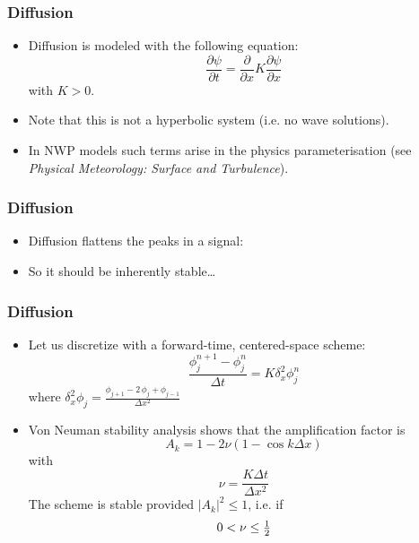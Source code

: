 \documentclass[aspectratio=43,9pt]{beamer}
\begin{document}
%
%
\begin{frame}
	\frametitle{Diffusion}
	\begin{itemize}
		\item Diffusion is modeled with the following equation:
			\begin{equation*}
				\frac{\partial \psi}{\partial t} = \frac{\partial}{\partial x} K \frac{\partial \psi}{\partial x}
			\end{equation*}
			with $K > 0$.\vspace*{2ex}
		\item Note that this is not a hyperbolic system (i.e. no wave solutions).\vspace*{2ex}
		\item In NWP models such terms arise in the physics parameterisation (see \emph{Physical Meteorology: Surface and Turbulence}).
	\end{itemize}
\end{frame}
%
%
\begin{frame}
	\frametitle{Diffusion}
	\begin{itemize}
		\item Diffusion flattens the peaks in a signal:
			\begin{center}
				\scalebox{.7}{}
			\end{center}
		\item So it should be inherently stable\ldots
	\end{itemize}
\end{frame}
%
%
\begin{frame}
	\frametitle{Diffusion}
	\begin{itemize}
		\item Let us discretize with a forward-time, centered-space scheme:
			\begin{equation*}
				\frac{\phi^{n+1}_j - \phi^n_j}{\Delta t} = K\delta_x^2\phi^n_j
			\end{equation*}
			where $\delta_x^2\phi_j=\frac{\phi_{j+1} - 2 \, \phi_j + \phi_{j-1}}{\Delta x^2}$
		\item Von Neuman stability analysis shows that the amplification factor is
			\begin{equation*}
				A_k = 1 - 2 \nu \left(
					1 - \cos k \Delta x
				\right)
			\end{equation*}
			with
			\begin{equation*}
				\nu = \frac{K \Delta t}{\Delta x^2}
			\end{equation*}
			The scheme is stable provided $\left|A_k\right|^2\le 1$, i.e. if
			\begin{equation*}
				0 < \nu \le {\textstyle\frac{1}{2}}
			\end{equation*}
	\end{itemize}
\end{frame}
\end{document}
